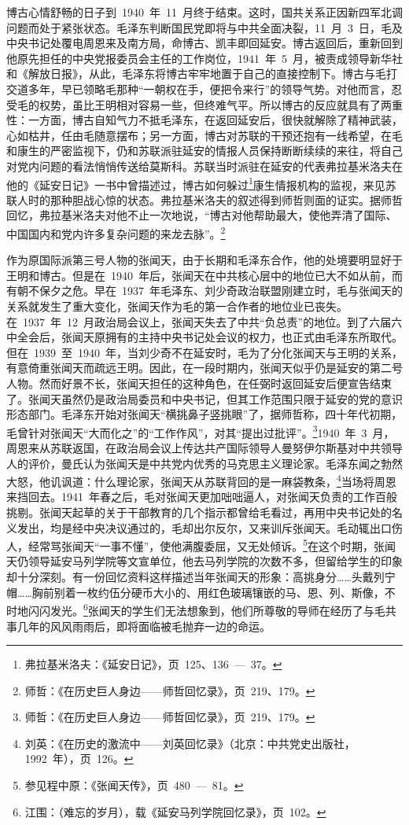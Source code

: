 博古心情舒畅的日子到~1940~年~11~月终于结束。这时，国共关系正因新四军北调问题而处于紧张状态。毛泽东判断国民党即将与中共全面决裂，11~月~3~日，毛及中央书记处覆电周恩来及南方局，命博古、凯丰即回延安。博古返回后，重新回到他原先担任的中央党报委员会主任的工作岗位，1941~年~5~月，被责成领导新华社和《解放日报》，从此，毛泽东将博古牢牢地置于自己的直接控制下。博古与毛打交道多年，早已领略毛那种“一朝权在手，便把令来行”的领导气势。对他而言，忍受毛的权势，虽比王明相对容易一些，但终难气平。所以博古的反应就具有了两重性：一方面，博古自知气力不抵毛泽东，在返回延安后，很快就解除了精神武装，心如枯井，任由毛随意摆布；另一方面，博古对苏联的干预还抱有一线希望，在毛和康生的严密监视下，仍和苏联派驻延安的情报人员保持断断续续的来往，将自己对党内问题的看法悄悄传送给莫斯科。苏联当时派驻在延安的代表弗拉基米洛夫在他的《延安日记》一书中曾描述过，博古如何躲过\footnote{弗拉基米洛夫：《延安日记》，页~125、136~—~37。}康生情报机构的监视，来见苏联人时的那种胆战心惊的状态。弗拉基米洛夫的叙述得到师哲则面的证实。据师哲回忆，弗拉基米洛夫对他不止一次地说，“博古对他帮助最大，使他弄清了国际、中国国内和党内许多复杂问题的来龙去脉”。\footnote{师哲：《在历史巨人身边——师哲回忆录》，页~219、179。}

作为原国际派第三号人物的张闻天，由于长期和毛泽东合作，他的处境要明显好于王明和博古。但是在~1940~年后，张闻天在中共核心层中的地位已大不如从前，而有朝不保夕之危。早在~1937~年毛泽东、刘少奇政治联盟刚建立时，毛与张闻天的关系就发生了重大变化，张闻天作为毛的第一合作者的地位业已丧失。在~1937~年~12~月政治局会议上，张闻天失去了中共“负总责”的地位。到了六届六中全会后，张闻天原拥有的主持中央书记处会议的权力，也正式由毛泽东所取代。但在~1939~至~1940~年，当刘少奇不在延安时，毛为了分化张闻天与王明的关系，有意倚重张闻天而疏远王明。因此，在一段时期内，张闻天似乎仍是延安的第二号人物。然而好景不长，张闻天担任的这种角色，在任弼时返回延安后便宣告结束了。张闻天虽然仍是政治局委员和中央书记，但其工作范围只限于延安的党的意识形态部门。毛泽东开始对张闻天“横挑鼻子竖挑眼”了，据师哲称，四十年代初期，毛曾针对张闻天“大而化之”的“工作作风”，对其“提出过批评”。\footnote{师哲：《在历史巨人身边——师哲回忆录》，页~219、179。}1940~年~3~月，周恩来从苏联返国，在政治局会议上传达共产国际领导人曼努伊尔斯基对中共领导人的评价，曼氏认为张闻天是中共党内优秀的马克思主义理论家。毛泽东闻之勃然大怒，他讥讽道：什么理论家，张闻天从苏联背回的是一麻袋教条，\footnote{刘英：《在历史的激流中——刘英回忆录》（北京：中共党史出版社，1992~年），页~126。}当场将周恩来挡回去。1941~年春之后，毛对张闻天更加咄咄逼人，对张闻天负责的工作百般挑剔。张闻天起草的关于干部教育的几个指示都曾给毛看过，再用中央书记处的名义发出，均是经中央决议通过的，毛却出尔反尔，又来训斥张闻天。毛动辄出口伤人，经常骂张闻天“一事不懂”，使他满腹委屈，又无处倾诉。\footnote{参见程中原：《张闻天传》，页~480~—~81。}在这个时期，张闻天仍领导延安马列学院等文宣单位，他去马列学院的次数不多，但留给学生的印象却十分深刻。有一份回忆资料这样描述当年张闻天的形象：高挑身分……头戴列宁帽……胸前别着一枚约伍分硬币大小的、用红色玻璃镶嵌的马、恩、列、斯像，不时地闪闪发光。\footnote{江围：（难忘的岁月），载《延安马列学院回忆录》，页~102。}张闻天的学生们无法想象到，他们所尊敬的导师在经历了与毛共事几年的风风雨雨后，即将面临被毛抛弃一边的命运。

